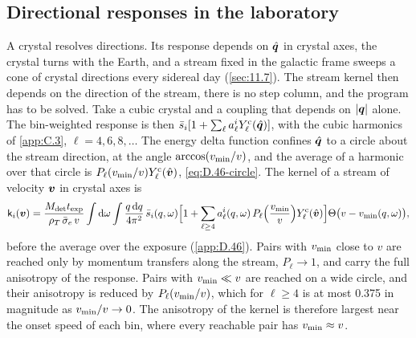\subsection{Directional responses in the laboratory}\label{sec:21.2-dir}

A crystal resolves directions. Its response depends on $\hat{\bm{q}}$ in crystal axes, the crystal turns with the Earth, and a stream fixed in the galactic frame sweeps a cone of crystal directions every sidereal day (\cref{sec:11.7}). The stream kernel then depends on the direction of the stream, there is no step column, and the program has to be solved. Take a cubic crystal and a coupling that depends on $|\bm{q}|$ alone. The bin-weighted response is then $\bar s_i[1 + \sum_\ell a^i_\ell Y^{\mathrm{c}}_\ell(\hat{\bm{q}})]$, with the cubic harmonics of \cref{app:C.3}, $\ell = 4, 6, 8, \dots$ The energy delta function confines $\hat{\bm{q}}$ to a circle about the stream direction, at the angle $\arccos(v_{\mathrm{min}}/v)$, and the average of a harmonic over that circle is $P_\ell(v_{\mathrm{min}}/v)Y^{\mathrm{c}}_\ell(\hat{\bm{v}})$, \cref{eq:D.46-circle}. The kernel of a stream of velocity $\bm{v}$ in crystal axes is
\begin{equation}
  \mathsf{k}_i(\bm{v}) = \frac{M_{\mathrm{det}}t_{\mathrm{exp}}}{\rho_T\,\bar{\sigma}_{e}\,v}\int\mathrm{d}\omega\int\frac{q\,\mathrm{d} q}{4\pi^2}\,\bar s_i(q,\omega)\Bigl[1 + \sum_{\ell \ge 4}a^i_\ell(q,\omega)\,P_\ell\Bigl(\frac{v_{\mathrm{min}}}{v}\Bigr)Y^{\mathrm{c}}_\ell(\hat{\bm{v}})\Bigr]\Theta\bigl(v - v_{\mathrm{min}}(q,\omega)\bigr) ,
  \label{eq:21.2-multipole}
\end{equation}
before the average over the exposure (\cref{app:D.46}). Pairs with $v_{\mathrm{min}}$ close to $v$ are reached only by momentum transfers along the stream, $P_\ell \to 1$, and carry the full anisotropy of the response. Pairs with $v_{\mathrm{min}} \ll v$ are reached on a wide circle, and their anisotropy is reduced by $P_\ell(v_{\mathrm{min}}/v)$, which for $\ell \ge 4$ is at most 0.375 in magnitude as $v_{\mathrm{min}}/v \to 0$. The anisotropy of the kernel is therefore largest near the onset speed of each bin, where every reachable pair has $v_{\mathrm{min}} \approx v$.

